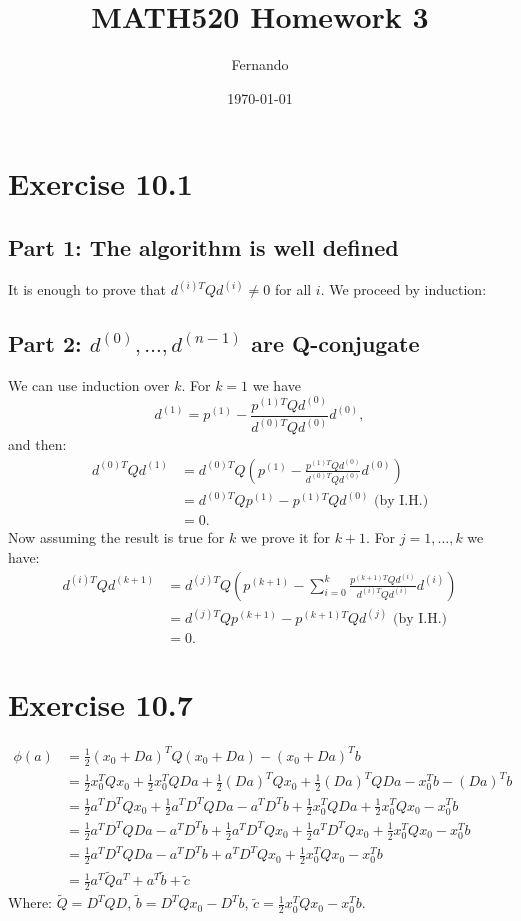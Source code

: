 \documentclass{article}
\begin{document}
\title{MATH520 Homework 3}
\author{Fernando}
\date{\today}
\maketitle

\section*{Exercise 10.1}
\subsection*{Part 1: The algorithm is well defined}
It is enough to prove that $d^{(i)T}Qd^{(i)}\neq 0$ for all $i$.
We proceed by induction:
\subsection*{Part 2: $d^{(0)},\dots,d^{(n-1)}$ are Q-conjugate}
We can use induction over $k$. For $k=1$ we have
\[
	d^{(1)}=p^{(1)}-\frac{p^{(1)T}Qd^{(0)}}{d^{(0)T}Qd^{(0)}}d^{(0)},
\]
and then:
\begin{align*}
	d^{(0)T}Qd^{(1)}&=
	d^{(0)T}Q\left(p^{(1)}-\frac{p^{(1)T}Qd^{(0)}}{d^{(0)T}Qd^{(0)}}d^{(0)}\right)\\
	&=
	d^{(0)T}Qp^{(1)}-p^{(1)T}Qd^{(0)} \text{ (by I.H.)}\\
	&=0.
\end{align*}
Now assuming the result is true for $k$ we prove it for $k+1$. For
$j=1,\dots,k$ we have:
\begin{align*}
	d^{(i)T}Qd^{(k+1)}&=
	d^{(j)T}Q\left(p^{(k+1)}-\sum_{i=0}^k\frac{p^{(k+1)T}Qd^{(i)}}{d^{(i)T}Qd^{(i)}}d^{(i)}\right)\\
	&=
	d^{(j)T}Qp^{(k+1)}-p^{(k+1)T}Qd^{(j)} \text{ (by I.H.)}\\
	&=0.
\end{align*}
\section*{Exercise 10.7}
\begin{align*}
	\phi(a)&=\frac{1}{2}(x_0+Da)^TQ(x_0+Da)-(x_0+Da)^Tb\\
	&=\frac{1}{2}x_0^TQx_0+\frac{1}{2}x_0^TQDa+\frac{1}{2}(Da)^TQx_0+\frac{1}{2}(Da)^TQDa -x_0^Tb-(Da)^Tb\\
	&=\frac{1}{2}a^TD^TQx_0+\frac{1}{2}a^TD^TQDa-a^TD^Tb+\frac{1}{2}x_0^TQDa + \frac{1}{2}x_0^TQx_0-x_0^Tb\\
	&=\frac{1}{2}a^TD^TQDa-a^TD^Tb+\frac{1}{2}a^TD^TQx_0+\frac{1}{2}a^TD^TQx_0 + \frac{1}{2}x_0^TQx_0-x_0^Tb\\
	&=\frac{1}{2}a^TD^TQDa-a^TD^Tb+a^TD^TQx_0+ \frac{1}{2}x_0^TQx_0-x_0^Tb\\
	&=\frac{1}{2}a^T\tilde{Q}a^T+a^T\tilde{b}+\tilde{c}
\end{align*}
Where: $\tilde{Q}=D^TQD$, $\tilde{b}=D^TQx_0-D^Tb$, $\tilde{c}=\frac{1}{2}x_0^TQx_0-x_0^Tb$.
\end{document}

